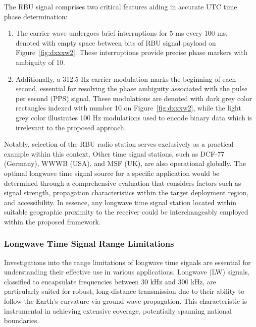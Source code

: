 \documentclass[12pt, a4paper]{extarticle}
\begin{document}
The RBU signal comprises two critical features aiding in accurate UTC time
phase determination:

\begin{enumerate}[noitemsep]
    \item The carrier wave undergoes brief interruptions for 5 ms every
        100 ms, denoted with empty space between bits of RBU signal payload on
        Figure~\ref{fig:dxxxw2}. These interruptions provide precise phase
        markers with ambiguity of 10.
    \item Additionally, a 312.5 Hz carrier modulation marks the beginning of
        each second, essential for resolving the phase ambiguity associated
        with the pulse per second (PPS) signal. These modulations are denoted
        with dark grey color rectangles indexed with number 10 on
        Figure~\ref{fig:dxxxw2}, while the light grey color illustrates 100 Hz
        modulations used to encode binary data which is irrelevant to the
        proposed approach.
\end{enumerate}



Notably, selection of the RBU radio station serves exclusively as a practical
example within this context. Other time signal stations, such as DCF-77
(Germany), WWWB (USA), and MSF (UK), are also operational globally.  The
optimal longwave time signal source for a specific application would be
determined through a comprehensive evaluation that considers factors such as
signal strength, propagation characteristics within the target deployment
region, and accessibility.  In essence, any longwave time signal station
located within suitable geographic proximity to the receiver could be
interchangeably employed within the proposed framework.

\subsubsection{Longwave Time Signal Range Limitations}

Investigations into the range limitations of longwave time signals are
essential for understanding their effective use in various applications.
Longwave (LW) signals, classified to encapsulate frequencies between 30 kHz and
300 kHz, are particularly suited for robust, long-distance transmission due to
their ability to follow the Earth's curvature via ground wave propagation. This
characteristic is instrumental in achieving extensive coverage, potentially
spanning national boundaries.
\end{document}
